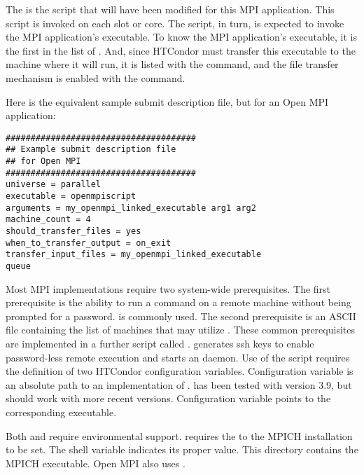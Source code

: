 The  is the  script that will have been
modified for this MPI application.
This script is invoked on each slot or core.
The script, in turn, is expected to invoke the MPI application's executable.
To know the MPI application's executable,
it is the first in the list of .
And, since HTCondor must transfer this executable to the machine where
it will run,
it is listed with the  command,
and the file transfer mechanism is enabled with
the  command.

Here is the equivalent sample submit description file,
but for an Open MPI application:

\footnotesize
\begin{verbatim}
######################################
## Example submit description file
## for Open MPI
######################################
universe = parallel
executable = openmpiscript
arguments = my_openmpi_linked_executable arg1 arg2
machine_count = 4
should_transfer_files = yes
when_to_transfer_output = on_exit
transfer_input_files = my_openmpi_linked_executable
queue
\end{verbatim}
\normalsize

Most MPI implementations require two system-wide prerequisites.
The first prerequisite is the ability to run a command
on a remote machine without being prompted for a password.
 is commonly used.
The second prerequisite is an ASCII file containing the
list of machines that may utilize .
These common prerequisites are implemented in a further script
called .
 generates ssh keys to enable password-less remote execution
and starts an  daemon.
Use of the  script requires the definition of
two HTCondor configuration variables.
Configuration variable  is an absolute path to
an implementation of .
 has been tested with  version 3.9,
but should work with more recent versions.
Configuration variable  points
to the corresponding  executable.

Both  and 
require environmental support.
 requires the  to the MPICH installation to be set.
The shell variable  indicates its proper value.
This directory contains the MPICH  executable.
Open MPI also uses .

